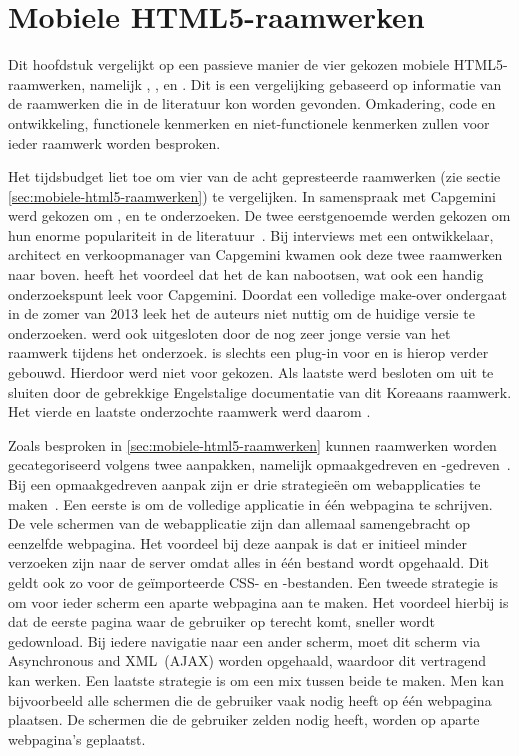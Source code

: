 \chapter{Mobiele HTML5-raamwerken}
\label{chap:raamwerken}

Dit hoofdstuk vergelijkt op een passieve manier de vier gekozen mobiele HTML5-raamwerken, namelijk \st{}, \kendo{}, \jqm{} en \lungo{}.
Dit is een vergelijking gebaseerd op informatie van de raamwerken die in de literatuur kon worden gevonden.
Omkadering, code en ontwikkeling, functionele kenmerken en niet-functionele kenmerken zullen voor ieder raamwerk worden besproken.

Het tijdsbudget liet toe om vier van de acht gepresteerde raamwerken (zie sectie \ref{sec:mobiele-html5-raamwerken}) te vergelijken.
In samenspraak met Capgemini werd gekozen om \jqm{}, \st{} en \kendo{} te onderzoeken.
De twee eerstgenoemde werden gekozen om hun enorme populariteit in de literatuur~\cite{Firtman2013,Hales2012,Oeflman2011,David2011}.
Bij interviews met een ontwikkelaar, architect en verkoopmanager van Capgemini kwamen ook deze twee raamwerken naar boven.
\kendo{} heeft het voordeel dat het de  kan nabootsen, wat ook een handig onderzoekspunt leek voor Capgemini.
Doordat \tmp{} een volledige make-over ondergaat in de zomer van 2013 leek het de auteurs niet nuttig om de huidige versie te onderzoeken.
\moobile{} werd ook uitgesloten door de nog zeer jonge versie van het raamwerk tijdens het onderzoek.
\jqt{} is slechts een plug-in voor \jqm{} en \st{} is hierop verder gebouwd.
Hierdoor werd niet voor \jqt{} gekozen.
Als laatste werd besloten om \davinci{} uit te sluiten door de gebrekkige Engelstalige documentatie van dit Koreaans raamwerk.
Het vierde en laatste onderzochte raamwerk werd daarom \lungo{}.

Zoals besproken in \ref{sec:mobiele-html5-raamwerken} kunnen raamwerken worden gecategoriseerd volgens twee aanpakken, namelijk opmaakgedreven en \js{}-gedreven~\cite{Oeflman2011}. 
Bij een opmaakgedreven aanpak zijn er drie strategieën om webapplicaties te maken~\cite{Broulik2012}. 
Een eerste is om de volledige applicatie in één webpagina te schrijven. 
De vele schermen van de webapplicatie zijn dan allemaal samengebracht op eenzelfde webpagina. 
Het voordeel bij deze aanpak is dat er initieel minder verzoeken zijn naar de server omdat alles in één bestand wordt opgehaald. 
Dit geldt ook zo voor de geïmporteerde CSS- en \js{}-bestanden. 
Een tweede strategie is om voor ieder scherm een aparte webpagina aan te maken. 
Het voordeel hierbij is dat de eerste pagina waar de gebruiker op terecht komt, sneller wordt gedownload. 
Bij iedere navigatie naar een ander scherm, moet dit scherm via Asynchronous \js{} and XML~(AJAX) worden opgehaald, waardoor dit vertragend kan werken. 
Een laatste strategie is om een mix tussen beide te maken. 
Men kan bijvoorbeeld alle schermen die de gebruiker vaak nodig heeft op één webpagina plaatsen. 
De schermen die de gebruiker zelden nodig heeft, worden op aparte webpagina's geplaatst.   


